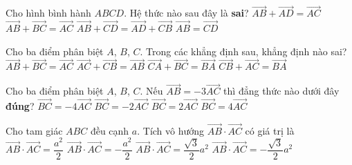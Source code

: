 \begin{ex}%
	Cho hình bình hành $ABCD$. Hệ thức nào sau đây là \textbf{sai}?
	\choice
	{$\overrightarrow{AB}+\overrightarrow{AD}=\overrightarrow{AC}$}
	{$\overrightarrow{AB}+\overrightarrow{BC}=\overrightarrow{AC}$}
	{$\overrightarrow{AB}+\overrightarrow{CD}=\overrightarrow{AD}+\overrightarrow{CB}$}
	{\True $\overrightarrow{AB}=\overrightarrow{CD}$}
	\loigiai
	{}
\end{ex}

\begin{ex}%
	Cho ba điểm phân biệt $A$, $B$, $C$. Trong các khẳng định sau, khẳng định nào sai?
	\choice
	{$\overrightarrow{AB}+\overrightarrow{BC}=\overrightarrow{AC}$}
	{$\overrightarrow{AC}+\overrightarrow{CB}=\overrightarrow{AB}$}
	{$\overrightarrow{CA}+\overrightarrow{BC}=\overrightarrow{BA}$}
	{\True $\overrightarrow{CB}+\overrightarrow{AC}=\overrightarrow{BA}$}
\end{ex}

\begin{ex}%
	Cho ba điểm phân biệt $A$, $B$, $C$. Nếu $\vec{AB}=-3\vec{AC}$ thì đẳng thức nào dưới đây \textbf{đúng}?
	\choice
	{$\vec{BC}=-4\vec{AC}$}
	{$\vec{BC}=-2\vec{AC}$}
	{$\vec{BC}=2\vec{AC}$}
	{\True $\vec{BC}=4\vec{AC}$}
\end{ex}

\begin{ex}%
	Cho tam giác $A B C$ đều cạnh $a$. Tích vô hướng $\overrightarrow{A B}\cdot \overrightarrow{A C}$ có giá trị là
	\choice
	{\True $\overrightarrow{A B}\cdot \overrightarrow{A C}=\dfrac{a^2}{2}$}
	{$\overrightarrow{A B}\cdot \overrightarrow{A C}=-\dfrac{a^2}{2}$}
	{$\overrightarrow{A B}\cdot \overrightarrow{A C}=\dfrac{\sqrt{3}}{2}a^2$}
	{$\overrightarrow{A B}\cdot \overrightarrow{A C}=-\dfrac{\sqrt{3}}{2}a^2$}
\end{ex}

